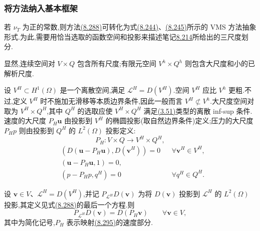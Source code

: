 \subsubsection{将方法纳入基本框架}
\label{subsubsec:vms-coarse-projection-basic-framework}

\begin{note}[速度、压力粗空间及相应投影]
\label{note:vms-coarse-projection-spaces}
若 $\nu_T$ 为正的常数,则方法\hyperref[eq:vms-coarse-projection-three-scale-method]{(8.288)}可转化为式\hyperref[eq:vms-three-scale-model-large]{(8.244)}、\hyperref[eq:vms-three-scale-model-small]{(8.245)}所示的 VMS 方法抽象形式.为此,需要用恰当选取的函数空间和投影来描述笔记\hyperref[note:vms-three-scale-approach]{8.214}所给出的三尺度划分.

显然,连续空间对 $V\times Q$ 包含所有尺度;有限元空间 $V^h\times Q^h$ 则包含大尺度和小的已解析尺度.

设 $V^H\subset H^1(\Omega)$ 是一个离散空间,满足 $\mathcal L^H=D(V^H)$.空间 $V^H$ 应比 $V^h$ 更粗.不过,定义 $V^H$ 时不施加无滑移等本质边界条件,因此一般而言 $V^H\not\subset V^h$.大尺度空间对取为 $V^H\times Q^H$,其中 $Q^H$ 的选取应使 $V^H\times Q^H$ 满足\hyperref[eq:discrete-infsup-condition]{(3.51)}类型的离散 inf-sup 条件.速度的大尺度 $P_H\bm u$ 由投影到 $V^H$ 的椭圆投影(取自然边界条件)定义;压力的大尺度 $P_Hp$ 则由投影到 $Q^H$ 的 $L^2(\Omega)$ 投影定义:
\[
 P_H:V\times Q\to V^H\times Q^H,
\]
\begin{equation}\label{eq:vms-coarse-projection-large-scales}
\begin{aligned}
 &(D(\bm u-P_H\bm u),D(\bm v^H))=0
 &&\forall\bm v^H\in V^H,\\
 &(\bm u-P_H\bm u,1)=0,\\
 &(p-P_Hp,q^H)=0
 &&\forall q^H\in Q^H.
\end{aligned}
\end{equation}
\end{note}

\begin{lemma}[大尺度定义与微分运算的交换性]
\label{lem:vms-coarse-projection-commutation}
设 $\bm v\in V$、$\mathcal L^H=D(V^H)$,并记 $P_{\mathcal L^H}D(\bm v)$ 为将 $D(\bm v)$ 投影到 $\mathcal L^H$ 的 $L^2(\Omega)$ 投影,其定义见式\hyperref[eq:vms-coarse-projection-three-scale-method]{(8.288)}的最后一个方程.则
\begin{equation}\label{eq:vms-coarse-projection-commutation}
 P_{\mathcal L^H}D(\bm v)=D(P_H\bm v)
 \qquad\forall\bm v\in V,
\end{equation}
其中为简化记号,$P_H$ 表示映射\hyperref[eq:vms-coarse-projection-large-scales]{(8.295)}的速度部分.
\end{lemma}

